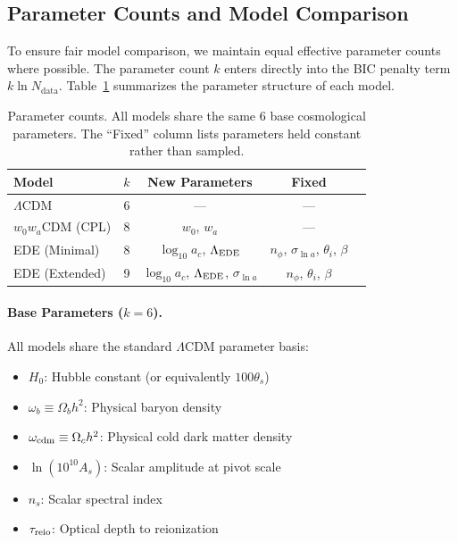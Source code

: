 \documentclass[a4paper,11pt]{article}
\begin{document}

\subsection{Parameter Counts and Model Comparison}
\label{sec:param_diet}

To ensure fair model comparison, we maintain equal effective parameter counts where possible. The parameter count $k$ enters directly into the BIC penalty term $k \ln N_{\mathrm{data}}$. Table~\ref{tab:param_counts} summarizes the parameter structure of each model.

\begin{table}[h]
\centering
\caption{Parameter counts. All models share the same 6 base cosmological parameters. The ``Fixed'' column lists parameters held constant rather than sampled.}
\label{tab:param_counts}
\begin{tabular}{lcccc}
\toprule
Model & $k$ & New Parameters & Fixed \\
\midrule
$\Lambda$CDM & 6 & --- & --- \\
$w_0w_a$CDM (CPL) & 8 & $w_0$, $w_a$ & --- \\
EDE (Minimal) & 8 & $\log_{10}a_c$, $\Lambda_{\rm EDE}$ & $n_\phi$, $\sigma_{\ln a}$, $\theta_i$, $\beta$ \\
EDE (Extended) & 9 & $\log_{10}a_c$, $\Lambda_{\rm EDE}$, $\sigma_{\ln a}$ & $n_\phi$, $\theta_i$, $\beta$ \\
\bottomrule
\end{tabular}
\end{table}

\paragraph{Base Parameters ($k = 6$).}
All models share the standard $\Lambda$CDM parameter basis:
\begin{itemize}
    \item $H_0$: Hubble constant (or equivalently $100\theta_s$)
    \item $\omega_b \equiv \Omega_b h^2$: Physical baryon density
    \item $\omega_{\rm cdm} \equiv \Omega_c h^2$: Physical cold dark matter density
    \item $\ln(10^{10}A_s)$: Scalar amplitude at pivot scale
    \item $n_s$: Scalar spectral index
    \item $\tau_{\rm reio}$: Optical depth to reionization
\end{itemize}
\end{document}

